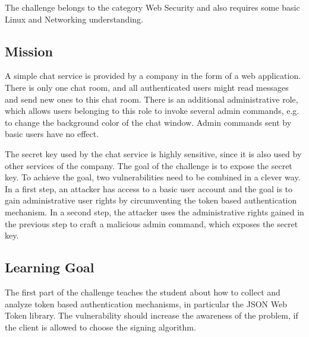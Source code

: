 \documentclass[12pt,a4paper]{article}
\begin{document}
The challenge belongs to the category Web Security and also requires some basic Linux and Networking understanding.

\subsection{Mission}

A simple chat service is provided by a company in the form of a web application. There is only one chat room, and all authenticated users might read messages and send new ones to this chat room. There is an additional administrative role, which allows users belonging to this role to invoke several admin commands, e.g. to change the background color of the chat window. Admin commands sent by basic users have no effect.

The secret key used by the chat service is  highly sensitive, since it is also used by other services of the company. The goal of the challenge is to expose the secret key.
To achieve the goal, two vulnerabilities need to be combined in a clever way.
In a first step, an attacker has access to a basic user account and the goal is to gain administrative user rights by circumventing the token based authentication mechanism.
In a second step, the attacker uses the administrative rights gained in the previous step to craft a malicious admin command, which exposes the secret key.


\subsection{Learning Goal}

The first part of the challenge teaches the student about how to collect and analyze token based authentication mechanisms, in particular the JSON Web Token library. The vulnerability should increase the awareness of the problem, if the client is allowed to choose the signing algorithm.
\end{document}
